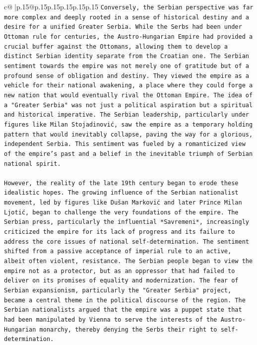 \documentclass{article}
\begin{document}
{\begin{supertabular}{c@{$\;$}|p{.15\linewidth}@{}p{.15\linewidth}p{.15\linewidth}p{.15\linewidth}p{.15\linewidth}p{.15\linewidth}}
{{{\texttt{Conversely, the Serbian perspective was far more complex and deeply rooted in a sense of historical destiny and a desire for a unified Greater Serbia. While the Serbs had been under Ottoman rule for centuries, the Austro{-}Hungarian Empire had provided a crucial buffer against the Ottomans, allowing them to develop a distinct Serbian identity separate from the Croatian one. The Serbian sentiment towards the empire was not merely one of gratitude but of a profound sense of obligation and destiny. They viewed the empire as a vehicle for their national awakening, a place where they could forge a new nation that would eventually rival the Ottoman Empire. The idea of a "Greater Serbia" was not just a political aspiration but a spiritual and historical imperative. The Serbian leadership, particularly under figures like Milan Stojadinović, saw the empire as a temporary holding pattern that would inevitably collapse, paving the way for a glorious, independent Serbia. This sentiment was fueled by a romanticized view of the empire's past and a belief in the inevitable triumph of Serbian national spirit.} \\
\\ 
\texttt{However, the reality of the late 19th century began to erode these idealistic hopes. The growing influence of the Serbian nationalist movement, led by figures like Dušan Marković and later Prince Milan Ljotić, began to challenge the very foundations of the empire. The Serbian press, particularly the influential *Savremeni*, increasingly criticized the empire for its lack of progress and its failure to address the core issues of national self{-}determination. The sentiment shifted from a passive acceptance of imperial rule to an active, albeit often violent, resistance. The Serbian people began to view the empire not as a protector, but as an oppressor that had failed to deliver on its promises of equality and modernization. The fear of Serbian expansionism, particularly the "Greater Serbia" project, became a central theme in the political discourse of the region. The Serbian nationalists argued that the empire was a puppet state that had been manipulated by Vienna to serve the interests of the Austro{-}Hungarian monarchy, thereby denying the Serbs their right to self{-}determination.} \\
\\ 
}}}
\end{supertabular}}
\end{document}
